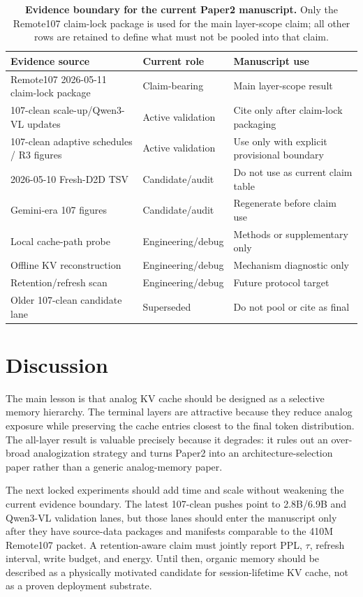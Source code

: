 \begin{table}[t]
\centering
\caption{\textbf{Evidence boundary for the current Paper2 manuscript.} Only the Remote107 claim-lock package is used for the main layer-scope claim; all other rows are retained to define what must not be pooled into that claim.}
\label{tab:paper2_evidence_boundary}
\begin{tabular}{lll}
\toprule
Evidence source & Current role & Manuscript use \\
\midrule
Remote107 2026-05-11 claim-lock package & Claim-bearing & Main layer-scope result \\
107-clean scale-up/Qwen3-VL updates & Active validation & Cite only after claim-lock packaging \\
107-clean adaptive schedules / R3 figures & Active validation & Use only with explicit provisional boundary \\
2026-05-10 Fresh-D2D TSV & Candidate/audit & Do not use as current claim table \\
Gemini-era 107 figures & Candidate/audit & Regenerate before claim use \\
Local cache-path probe & Engineering/debug & Methods or supplementary only \\
Offline KV reconstruction & Engineering/debug & Mechanism diagnostic only \\
Retention/refresh scan & Engineering/debug & Future protocol target \\
Older 107-clean candidate lane & Superseded & Do not pool or cite as final \\
\bottomrule
\end{tabular}
\end{table}

\section{Discussion}

The main lesson is that analog KV cache should be designed as a selective memory hierarchy. The terminal layers are attractive because they reduce analog exposure while preserving the cache entries closest to the final token distribution. The all-layer result is valuable precisely because it degrades: it rules out an over-broad analogization strategy and turns Paper2 into an architecture-selection paper rather than a generic analog-memory paper.

The next locked experiments should add time and scale without weakening the current evidence boundary. The latest 107-clean pushes point to 2.8B/6.9B and Qwen3-VL validation lanes, but those lanes should enter the manuscript only after they have source-data packages and manifests comparable to the 410M Remote107 packet. A retention-aware claim must jointly report PPL, $\tau$, refresh interval, write budget, and energy. Until then, organic memory should be described as a physically motivated candidate for session-lifetime KV cache, not as a proven deployment substrate.

